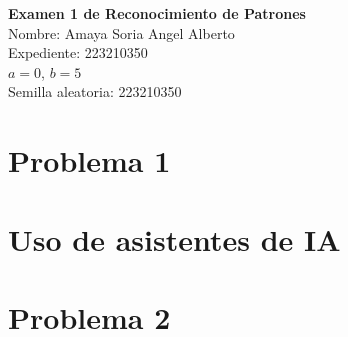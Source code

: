 \documentclass[11pt]{article}
\begin{document}
\begin{center}
\textbf{\Large Examen 1 de Reconocimiento de Patrones}\\
\vspace{0.5cm}
Nombre: Amaya Soria Angel Alberto\\[6pt]
Expediente: 223210350\\[6pt]
$a = 0$, \qquad $b = 5$\\[6pt]
Semilla aleatoria: 223210350
\end{center}

\newpage

\section*{Problema 1}


\newpage

\newpage

\newpage

\section*{Uso de asistentes de IA}


\section*{Problema 2}


\end{document}

